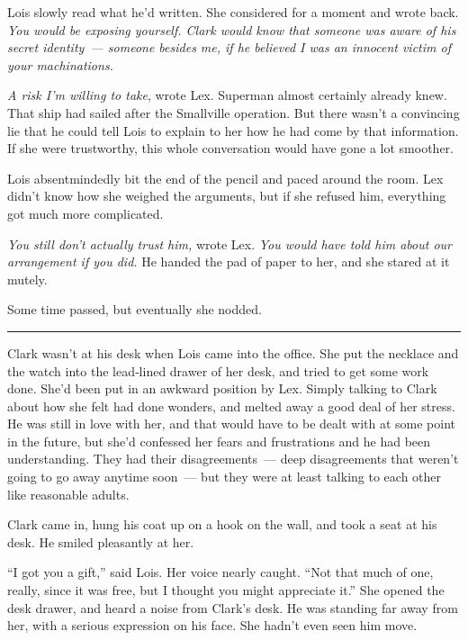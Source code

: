 \documentclass[ebook,12pt]{memoir}
\begin{document}
Lois slowly read what he'd written. She considered for a moment and
wrote back. \emph{You would be exposing yourself. Clark would know that
someone was aware of his secret identity~--- someone besides me, if he
believed I was an innocent victim of your machinations.}

\emph{A risk I'm willing to take}, wrote Lex. Superman almost certainly
already knew. That ship had sailed after the Smallville operation. But
there wasn't a convincing lie that he could tell Lois to explain to her
how he had come by that information. If she were trustworthy, this whole
conversation would have gone a lot smoother.

Lois absentmindedly bit the end of the pencil and paced around the room.
Lex didn't know how she weighed the arguments, but if she refused him,
everything got much more complicated.

\emph{You still don't actually trust him,} wrote Lex. \emph{You would
have told him about our arrangement if you did.} He handed the pad of
paper to her, and she stared at it mutely.

Some time passed, but eventually she nodded.

\begin{center}\rule{0.5\linewidth}{0.5pt}\end{center}

Clark wasn't at his desk when Lois came into the office. She put the
necklace and the watch into the lead‐lined drawer of her desk, and tried
to get some work done. She'd been put in an awkward position by Lex.
Simply talking to Clark about how she felt had done wonders, and melted
away a good deal of her stress. He was still in love with her, and that
would have to be dealt with at some point in the future, but she'd
confessed her fears and frustrations and he had been understanding. They
had their disagreements~--- deep disagreements that weren't going to go
away anytime soon~--- but they were at least talking to each other like
reasonable adults.

Clark came in, hung his coat up on a hook on the wall, and took a seat
at his desk. He smiled pleasantly at her.

``I got you a gift,'' said Lois. Her voice nearly caught. ``Not that
much of one, really, since it was free, but I thought you might
appreciate it.'' She opened the desk drawer, and heard a noise from
Clark's desk. He was standing far away from her, with a serious
expression on his face. She hadn't even seen him move.
\end{document}
